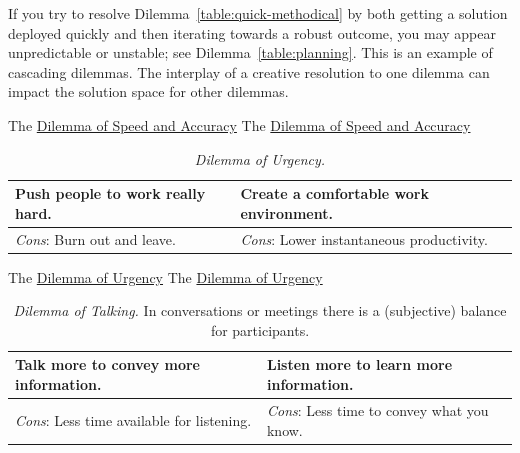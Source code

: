 If you try to resolve Dilemma~\ref{table:quick-methodical} by both getting a solution deployed quickly and then iterating towards a robust outcome, you may appear unpredictable or unstable; see Dilemma~\ref{table:planning}. This is an example of cascading dilemmas. The interplay of a creative resolution to one dilemma can impact the solution space for other dilemmas. 

The \href{table:quick-methodical}{Dilemma of Speed and Accuracy}
The \href{table:quick-methodical}{Dilemma of Speed and Accuracy}


\begin{center}
\begin{table}[H] %
\begin{tabular}{ | m{\dilemmatablewidth}| m{\dilemmatablewidth} | } 
  \hline
  \textbf{Push people to work really hard.} & 
  \textbf{Create a comfortable work environment.} \\ 
  \hline
  \textit{Cons}: Burn out and leave. & 
  \textit{Cons}: Lower instantaneous productivity. \\  
  \hline
\end{tabular}
\caption{
\textit{Dilemma of Urgency.}
}
\label{table:rate-of-work}
\end{table}
\end{center}

The \href{table:rate-of-work}{Dilemma of Urgency}
The \href{table:rate-of-work}{Dilemma of Urgency}


\begin{center}
\begin{table}[H] %
\begin{tabular}{ | m{\dilemmatablewidth}| m{\dilemmatablewidth} | } 
  \hline
  \textbf{Talk more to convey more information.} & 
  \textbf{Listen more to learn more information.} \\ 
  \hline
  \textit{Cons}: Less time available for listening. & 
  \textit{Cons}: Less time to convey what you know. \\  
  \hline
\end{tabular}
\caption{
\textit{Dilemma of Talking.}
In conversations or meetings there is a (subjective) balance for participants.
}
\label{table:talk-or-listen}
\end{table}
\end{center}

